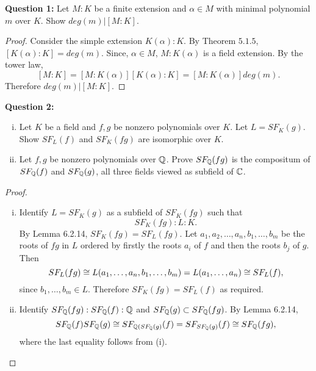 \textbf{Question 1:} Let $M:K$ be a finite extension and $\alpha\in M$ with minimal polynomial $m$ over $K$. Show $deg(m)|[M:K]$.
\begin{proof}
Consider the simple extension $K(\alpha):K$. By Theorem $5.1.5$, $[K(\alpha):K]=deg(m)$. Since, $\alpha\in M$, $M:K(\alpha)$ is a field extension. By the tower law, $$[M:K]=[M:K(\alpha)][K(\alpha):K]=[M:K(\alpha)]deg(m).$$ Therefore $deg(m)|[M:K].$
\end{proof}

\textbf{Question 2:}\begin{enumerate}[(i)]
    \item Let $K$ be a field and $f,g$ be nonzero polynomials over $K$. Let $L=SF_K(g)$. Show $SF_L(f)$ and $SF_K(fg)$ are isomorphic over $K.$
    \item Let $f,g$ be nonzero polynomials over $\mathbb{Q}$. Prove $SF_{\mathbb{Q}}(fg)$ is the compositum of $SF_{\mathbb{Q}}(f)$ and $SF_{\mathbb{Q}}(g)$, all three fields viewed as subfield of $\mathbb{C}$.
\end{enumerate}
\begin{proof}
\begin{enumerate}[(i)]
    \item Identify $L=SF_K(g)$ as a subfield of $SF_K(fg)$ such that $$SF_K(fg):L:K.$$ By Lemma 6.2.14, $SF_K(fg) = SF_L(fg).$ Let $a_1,a_2,\dots,a_n,b_1,\dots,b_m$ be the roots of $fg$ in $L$ ordered by firstly the roots $a_i$ of $f$ and then the roots $b_j$ of $g$. Then $$SF_L(fg)\cong L(a_1,\dots,a_n,b_1,\dots,b_m)=L(a_1,\dots,a_n)\cong SF_L(f),$$
    since $b_1,\dots,b_m\in L$. Therefore $SF_K(fg) = SF_L(f)$ as required.
    \item Identify $SF_{\mathbb{Q}}(fg):SF_{\mathbb{Q}}(f):\mathbb{Q}$ and $SF_{\mathbb{Q}}(g)\subset SF_{\mathbb{Q}}(fg)$. By Lemma 6.2.14, $$SF_{\mathbb{Q}}(f)SF_{\mathbb{Q}}(g)\cong SF_{\mathbb{Q}(SF_{\mathbb{Q}}(g)}(f)=SF_{SF_{\mathbb{Q}}(g)}(f)\cong SF_{\mathbb{Q}}(fg),$$
    where the last equality follows from (i).
    \end{enumerate}
\end{proof}